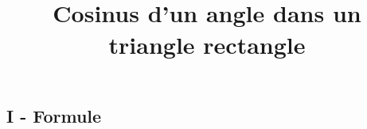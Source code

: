 \documentclass[paper=a4, fontsize=11pt]{scrartcl} %
\title{	
  \vspace{-7ex}
  \horrule{0.5pt} \\[0.4cm] %
  \huge Cosinus d'un angle dans un triangle rectangle
  \horrule{2pt} \\[0.5cm] %
}
\author{}
\date{\vspace{-10ex}} %
\begin{document}

\newtheorem{Definition}{Définition}
\newtheorem{Theorem}{Théorème}
\newtheorem{Proposition}{Propriété}

\renewcommand{\labelitemi}{$\bullet$}
\renewcommand{\labelitemii}{$\circ$}

\maketitle %
\setlength{\columnseprule}{1pt}

\subsection*{I - Formule}
\end{document}
